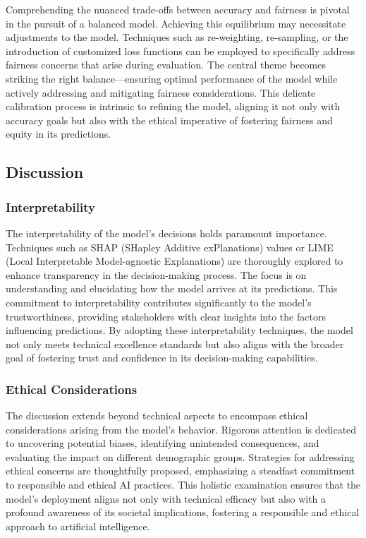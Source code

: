 \documentclass[12pt,a4paper,openright,twoside]{book}
\begin{document}
Comprehending the nuanced trade-offs between accuracy and fairness is pivotal in the pursuit of a balanced model. Achieving this equilibrium may necessitate adjustments to the model. Techniques such as re-weighting, re-sampling, or the introduction of customized loss functions can be employed to specifically address fairness concerns that arise during evaluation. The central theme becomes striking the right balance—ensuring optimal performance of the model while actively addressing and mitigating fairness considerations. This delicate calibration process is intrinsic to refining the model, aligning it not only with accuracy goals but also with the ethical imperative of fostering fairness and equity in its predictions.

\subsection{Discussion}

\subsubsection{Interpretability}

The interpretability of the model's decisions holds paramount importance. Techniques such as SHAP (SHapley Additive exPlanations) values or LIME (Local Interpretable Model-agnostic Explanations) are thoroughly explored to enhance transparency in the decision-making process. The focus is on understanding and elucidating how the model arrives at its predictions. This commitment to interpretability contributes significantly to the model's trustworthiness, providing stakeholders with clear insights into the factors influencing predictions. By adopting these interpretability techniques, the model not only meets technical excellence standards but also aligns with the broader goal of fostering trust and confidence in its decision-making capabilities.

\subsubsection{Ethical Considerations}

The discussion extends beyond technical aspects to encompass ethical considerations arising from the model's behavior. Rigorous attention is dedicated to uncovering potential biases, identifying unintended consequences, and evaluating the impact on different demographic groups. Strategies for addressing ethical concerns are thoughtfully proposed, emphasizing a steadfast commitment to responsible and ethical AI practices. This holistic examination ensures that the model's deployment aligns not only with technical efficacy but also with a profound awareness of its societal implications, fostering a responsible and ethical approach to artificial intelligence.
\end{document}
